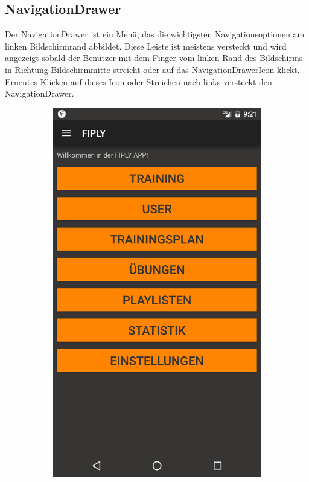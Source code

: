 \documentclass[FIPLY_base.tex]{subfiles}
\begin{document}
\subsection{NavigationDrawer}
Der NavigationDrawer ist ein Menü, das die wichtigsten Navigationsoptionen am linken Bildschirmrand abbildet.
Diese Leiste ist meistens versteckt und wird angezeigt sobald der Benutzer mit dem Finger vom linken Rand des Bildschirms in Richtung Bildschirmmitte streicht oder auf das NavigationDrawerIcon klickt.
Erneutes Klicken auf dieses Icon oder Streichen nach links versteckt den NavigationDrawer. 
\ \\
\begin{figure}[h]
	\begin{subfigure}[b]{0.3\textwidth}
	\includegraphics[scale=0.15]{img/NavDrawerClosed}

\end{subfigure}
\end{figure}
\end{document}
